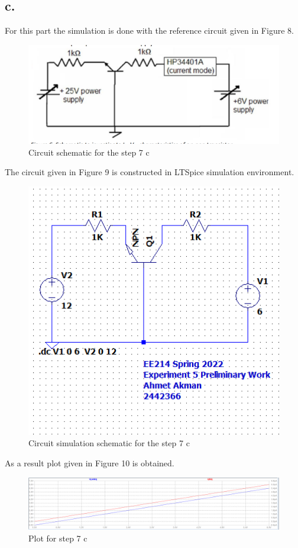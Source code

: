 \documentclass[letterpaper,12pt]{article}
\begin{document}
\subsection{c.}
For this part the simulation is done with the reference circuit given in Figure 8.
\begin{figure}[H]
    \centering
    \includegraphics[width=1\textwidth]{fig6.png}
    \caption{Circuit schematic for the step 7 c}
    \end{figure} 
    The circuit given in Figure 9 is constructed in LTSpice simulation environment.
\begin{figure}[H]
\centering
\includegraphics[width=1\textwidth]{6sim.png}
\caption{Circuit simulation schematic for the step 7 c}
\end{figure} 
As a result plot given in Figure 10 is obtained.
\begin{figure}[H]
    \centering
    \includegraphics[width=1\textwidth]{7_d_plot.png}
\caption{Plot for step 7 c}
\end{figure} 
\end{document}
